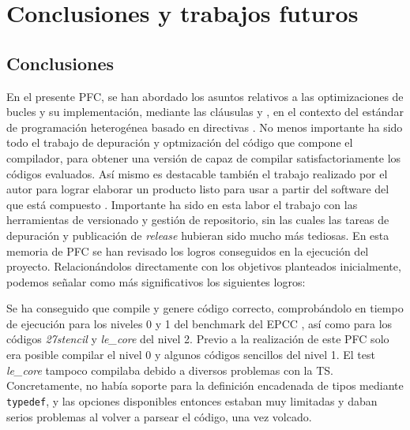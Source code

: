 %
%
%
%


\chapter{Conclusiones y trabajos futuros} \label{chap:conclusiones}  

\section{Conclusiones} \label{sec:conclusiones}

En el presente \acf{PFC}, se han abordado los asuntos relativos a las 
optimizaciones de bucles y su implementación, mediante las cláusulas \gang{} y \worker{}, 
en el contexto del estándar de programación heterogénea basado en directivas \OpenACC{}. 
No menos importante ha sido todo el trabajo de depuración y optmización del código que
compone el compilador, para obtener una versión de \accULL{} capaz de compilar 
satisfactoriamente los códigos evaluados. Así mismo es destacable también el trabajo
realizado por el autor para lograr elaborar un producto listo para usar a partir del
software del que está compuesto \accULL{}. 
Importante ha sido en esta labor el trabajo con las
herramientas de versionado y gestión de repositorio, sin las cuales las tareas de 
depuración y publicación de \textit{release} hubieran sido mucho más tediosas.
En esta memoria de PFC se han revisado los logros conseguidos en la ejecución del 
proyecto. Relacionándolos directamente con los objetivos planteados inicialmente, podemos 
señalar como más significativos los siguientes logros: 

Se ha conseguido que \accULL{} compile y genere código correcto, 
comprobándolo en tiempo de ejecución para los niveles 0 y 1 del benchmark del EPCC 
\cite{URL::ACCepccB}, así como para los códigos \textit{27stencil} y \textit{le\_core} del 
nivel 2. Previo a la realización de este \ac{PFC} solo era posible compilar el nivel 0 y 
algunos códigos sencillos del 
nivel 1. El test \textit{le\_core} tampoco compilaba debido a diversos problemas con la 
\ac{TS}. Concretamente, no había soporte para la definición encadenada de tipos mediante 
\texttt{typedef}, y las opciones disponibles entonces estaban muy limitadas y daban serios 
problemas al volver a parsear el código, una vez volcado.

